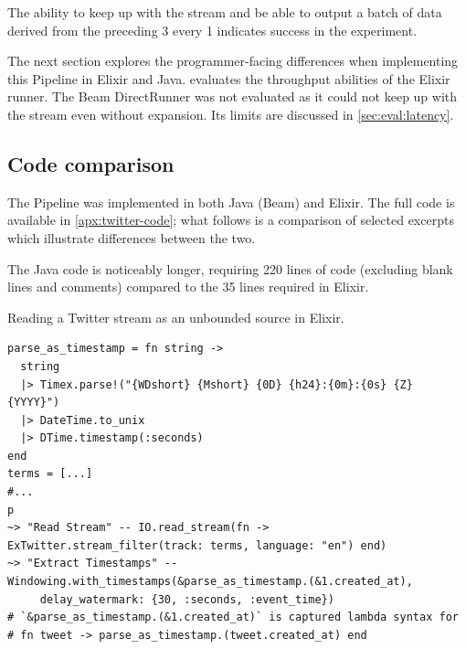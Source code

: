The ability to keep up with the stream and be able to output a batch of data derived from the preceding \SI{3}{\min} every \SI{1}{\min} indicates success in the experiment.

The next section explores the programmer-facing differences when implementing this Pipeline in Elixir and Java.
 evaluates the throughput abilities of the Elixir runner.
The Beam DirectRunner was not evaluated as it could not keep up with the stream even without expansion.
Its limits are discussed in \cref{sec:eval:latency}.

\subsection{Code comparison}\label{sec:eval:twitter:code}

The Pipeline was implemented in both Java (Beam) and Elixir.
The full code is available in \cref{apx:twitter-code}; what follows is a comparison of selected excerpts which illustrate differences between the two.

The Java code is noticeably longer, requiring 220 lines of code (excluding blank lines and comments) compared to the 35 lines required in Elixir.

\begin{codelisting}
	\caption{Reading a Twitter stream as an unbounded source in Elixir.}
	\label{lst:eval:twitter-readstream-elixir}
	\begin{verbatim}
parse_as_timestamp = fn string ->
  string
  |> Timex.parse!("{WDshort} {Mshort} {0D} {h24}:{0m}:{0s} {Z} {YYYY}")
  |> DateTime.to_unix
  |> DTime.timestamp(:seconds)
end
terms = [...]
#...
p
~> "Read Stream" -- IO.read_stream(fn -> ExTwitter.stream_filter(track: terms, language: "en") end)
~> "Extract Timestamps" -- Windowing.with_timestamps(&parse_as_timestamp.(&1.created_at),
     delay_watermark: {30, :seconds, :event_time})
# `&parse_as_timestamp.(&1.created_at)` is captured lambda syntax for
# fn tweet -> parse_as_timestamp.(tweet.created_at) end
	\end{verbatim}
\end{codelisting}

